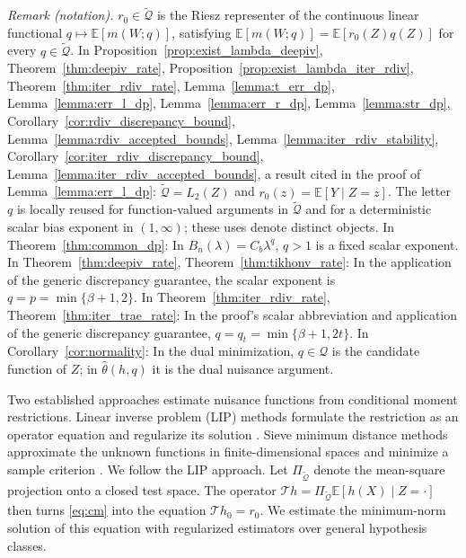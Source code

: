 \documentclass[12pt]{article}
\theoremstyle{plain}
\theoremstyle{definition}
\theoremstyle{remark}
\begin{document}
\noindent\textit{Remark (notation).} $r_0\in\tilde{\mathcal Q}$ is the Riesz representer of the continuous linear functional $q\mapsto\mathbb E[m(W;q)]$, satisfying $\mathbb E[m(W;q)]=\mathbb E[r_0(Z)q(Z)]$ for every $q\in\tilde{\mathcal Q}$. In Proposition~\ref{prop:exist_lambda_deepiv}, Theorem~\ref{thm:deepiv_rate}, Proposition~\ref{prop:exist_lambda_iter_rdiv}, Theorem~\ref{thm:iter_rdiv_rate}, Lemma~\ref{lemma:t_err_dp}, Lemma~\ref{lemma:err_l_dp}, Lemma~\ref{lemma:err_r_dp}, Lemma~\ref{lemma:str_dp}, Corollary~\ref{cor:rdiv_discrepancy_bound}, Lemma~\ref{lemma:rdiv_accepted_bounds}, Lemma~\ref{lemma:iter_rdiv_stability}, Corollary~\ref{cor:iter_rdiv_discrepancy_bound}, Lemma~\ref{lemma:iter_rdiv_accepted_bounds}, a result cited in the proof of Lemma~\ref{lemma:err_l_dp}: $\tilde{\mathcal Q}=L_2(Z)$ and $r_0(z)=\mathbb E[Y\mid Z=z]$. The letter $q$ is locally reused for function-valued arguments in $\tilde{\mathcal Q}$ and for a deterministic scalar bias exponent in $(1,\infty)$; these uses denote distinct objects. In Theorem~\ref{thm:common_dp}: In $B_n(\lambda)=C_b\lambda^q$, $q>1$ is a fixed scalar exponent. In Theorem~\ref{thm:deepiv_rate}, Theorem~\ref{thm:tikhonv_rate}: In the application of the generic discrepancy guarantee, the scalar exponent is $q=p=\min\{\beta+1,2\}$. In Theorem~\ref{thm:iter_rdiv_rate}, Theorem~\ref{thm:iter_trae_rate}: In the proof's scalar abbreviation and application of the generic discrepancy guarantee, $q=q_t=\min\{\beta+1,2t\}$. In Corollary~\ref{cor:normality}: In the dual minimization, $q\in\mathcal Q$ is the candidate function of $Z$; in $\hat\theta(h,q)$ it is the dual nuisance argument.


Two established approaches estimate nuisance functions from conditional moment restrictions. Linear inverse problem (LIP) methods formulate the restriction as an operator equation and regularize its solution \citep{carrascoChapter77Linear2007,darollesNonparametricInstrumentalRegression2011,bennett2023source}. Sieve minimum distance methods approximate the unknown functions in finite-dimensional spaces and minimize a sample criterion \citep{aiEfficientEstimationModels2003,chenEstimationNonparametricConditional2012}. We follow the LIP approach. Let $\Pi_{\tilde{\mathcal Q}}$ denote the mean-square projection onto a closed test space. The operator $\mathcal T h=\Pi_{\tilde{\mathcal Q}}\mathbb E[h(X)\mid Z=\cdot]$ then turns \eqref{eq:cm} into the equation $\mathcal T h_0=r_0$. We estimate the minimum-norm solution of this equation with regularized estimators over general hypothesis classes.
\end{document}
